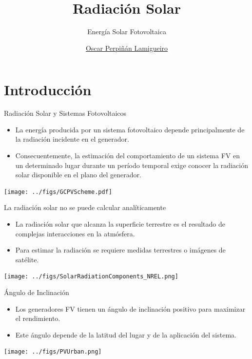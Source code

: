 \documentclass[xcolor={usenames,svgnames,dvipsnames}]{beamer}
\author{\href{https://oscarperpinan.github.io}{Oscar Perpiñán Lamigueiro}}
\date{}
\title{Radiación Solar}
\subtitle{Energía Solar Fotovoltaica}
\institute[UPM]{Universidad Politécnica de Madrid}
\begin{document}
\maketitle

\section{Introducción}
\label{sec:org7e2d9a5}

\begin{frame}[label={sec:org15ac504}]{Radiación Solar y Sistemas Fotovoltaicos}
\begin{itemize}
\item La \alert{energía producida} por un sistema fotovoltaico depende principalmente de la \alert{radiación incidente} en el generador.

\item Consecuentemente, la \alert{estimación del comportamiento} de un sistema FV en un determinado lugar durante un período temporal exige \alert{conocer la radiación solar disponible en el plano del generador}.
\end{itemize}

\begin{center}
\texttt{[image: ../figs/GCPVScheme.pdf]}
\end{center}
\end{frame}

\begin{frame}[label={sec:orgb1fd44d}]{La radiación solar no se puede calcular analíticamente}
\begin{itemize}
\item La radiación solar que alcanza la superficie terrestre es el resultado de complejas interacciones en la atmósfera.
\item Para estimar la radiación se requiere medidas terrestres o imágenes de satélite.
\end{itemize}
\begin{center}
\texttt{[image: ../figs/SolarRadiationComponents\_NREL.png]}
\end{center}
\end{frame}

\begin{frame}[label={sec:org3c5b864}]{Ángulo de Inclinación}
\begin{itemize}
\item Los generadores FV tienen un \alert{ángulo de inclinación positivo} para maximizar el rendimiento.
\item Este ángulo depende de la \alert{latitud} del lugar y de la \alert{aplicación del sistema}.
\end{itemize}

\begin{center}
\texttt{[image: ../figs/PVUrban.png]}
\end{center}
\end{frame}
\end{document}
